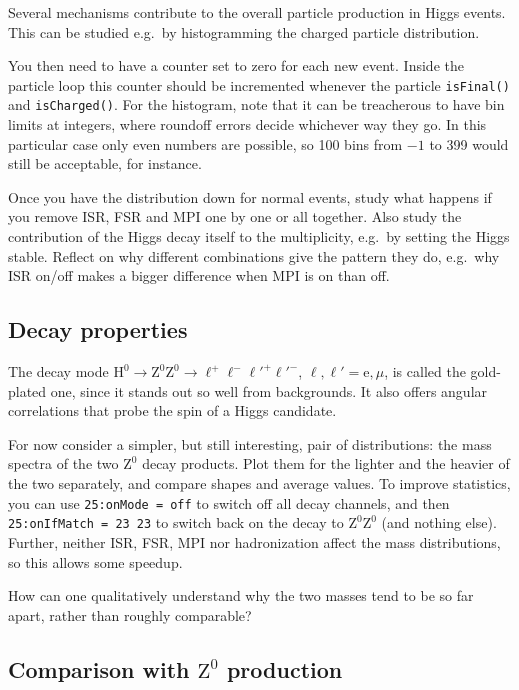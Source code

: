 \documentclass[12pt,a4paper]{article}
\newcommand{\e}{{\mathrm e}}
\renewcommand{\H}{{\mathrm H}}
\newcommand{\Z}{{\mathrm Z}}
\begin{document}
Several mechanisms contribute to the overall particle production in
Higgs events. This can be studied e.g.\ by histogramming the charged 
particle distribution.    

You then need to have a counter set to zero for each new event. Inside 
the particle loop this counter should be incremented whenever 
the particle \texttt{isFinal()} and \texttt{isCharged()}. For the histogram, 
note that it can be treacherous to have bin limits at integers, where 
roundoff errors decide whichever way they go. In this particular case 
only even numbers are possible, so 100 bins from $-1$ to 399 would still 
be acceptable, for instance.

Once you have the distribution down for normal events, study what happens 
if you remove ISR, FSR and MPI one by one or all together. Also study 
the contribution of the Higgs decay itself to the multiplicity, e.g.\ by 
setting the Higgs stable. Reflect on why different combinations give 
the pattern they do, e.g.\ why ISR on/off makes a bigger difference
when MPI is on than off. 

\subsection{Decay properties}

The decay mode $\H^0 \to \Z^0 \Z^0 \to \ell^+ \ell^- \ell'^+ \ell'^-$,
$\ell, \ell' = \e, \mu$, is called the gold-plated one, since it stands
out so well from backgrounds. It also offers angular correlations that
probe the spin of a Higgs candidate.

For now consider a simpler, but still interesting, pair of distributions:
the mass spectra of the two $\Z^0$ decay products. Plot them for the 
lighter and the heavier of the two separately, and compare shapes and 
average values. To improve statistics, you can use \texttt{25:onMode = off}
to switch off all decay channels, and then \texttt{25:onIfMatch = 23 23}
to switch back on the decay to $\Z^0 \Z^0$ (and nothing else). Further, 
neither ISR, FSR, MPI nor hadronization affect the mass distributions, 
so this allows some speedup.

How can one qualitatively understand why the two masses tend to be
so far apart, rather than roughly comparable? 

\subsection{Comparison with $\Z^0$ production}
\end{document}
